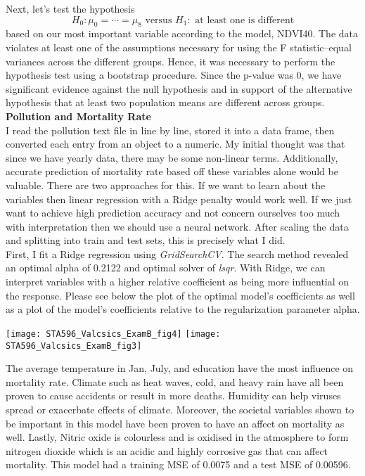 \documentclass[10pt]{article}
\begin{document}
Next, let's test the hypothesis $$H_{0}: \mu_{0} = \cdots = \mu_{8} \text{ versus } H_{1}: \text{ at least one is different}$$ based on our most important variable according to the model, NDVI40. The data violates at least one of the assumptions necessary for using the F statistic--equal variances across the different groups. Hence, it was necessary to perform the hypothesis test using a bootstrap procedure. Since the p-value was 0, we have significant evidence against the null hypothesis and in support of the alternative hypothesis that at least two population means are different across groups. 
\textbf{Pollution and Mortality Rate} \\

I read the pollution text file in line by line, stored it into a data frame, then converted each entry from an object to a numeric. My initial thought was that since we have yearly data, there may be some non-linear terms. Additionally, accurate prediction of mortality rate based off these variables alone would be valuable. There are two approaches for this. If we want to learn about the variables then linear regression with a Ridge penalty would work well. If we just want to achieve high prediction accuracy and not concern ourselves too much with interpretation then we should use a neural network. After scaling the data and splitting into train and test sets, this is precisely what I did. \\

First, I fit a Ridge regression using \textit{GridSearchCV}. The search method revealed an optimal alpha of 0.2122 and optimal solver of \textit{lsqr}. With Ridge, we can interpret variables with a higher relative coefficient as being more influential on the response. Please see below the plot of the optimal model's coefficients as well as a plot of the model's coefficients relative to the regularization parameter alpha. 
\begin{center}
	\texttt{[image: STA596\_Valcsics\_ExamB\_fig4]}
	\texttt{[image: STA596\_Valcsics\_ExamB\_fig3]}
\end{center}
The average temperature in Jan, July, and education have the most influence on mortality rate. Climate such as heat waves, cold, and heavy rain have all been proven to cause accidents or result in more deaths. Humidity can help viruses spread or exacerbate effects of climate. Moreover, the societal variables shown to be important in this model have been proven to have an affect on mortality as well. Lastly, Nitric oxide is colourless and is oxidised in the atmosphere to form nitrogen dioxide which is an acidic and highly corrosive gas that can affect mortality. This model had a training MSE of 0.0075 and a test MSE of 0.00596. \\
\end{document}
